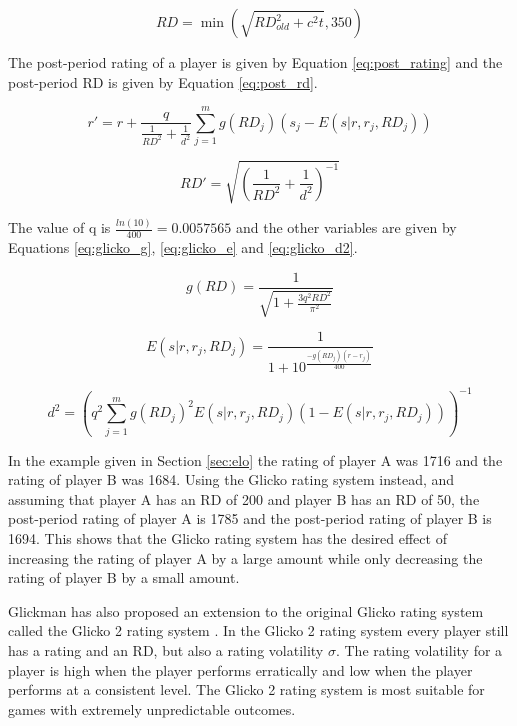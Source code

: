 \begin{equation} \label{eq:pre_rd}
RD = \min \left( \sqrt{RD_{old}^2 + c^2t}, 350 \right)
\end{equation}

The post-period rating of a player is given by Equation \ref{eq:post_rating} and the post-period RD is given by Equation \ref{eq:post_rd}.

\begin{equation} \label{eq:post_rating}
r' = r + \frac{q}{\frac{1}{RD^2} + \frac{1}{d^2}} \sum \limits_{j=1}^m g \left( RD_j \right) \left( s_j - E \left( s | r, r_j, RD_j \right) \right)
\end{equation}

\begin{equation} \label{eq:post_rd}
RD' = \sqrt{\left( \frac{1}{RD^2} + \frac{1}{d^2} \right)^{-1}}
\end{equation}

The value of q is $\frac{ln \left( 10 \right)}{400} = 0.0057565$ and the other variables are given by Equations \ref{eq:glicko_g}, \ref{eq:glicko_e} and \ref{eq:glicko_d2}.

\begin{equation} \label{eq:glicko_g}
g \left( RD \right) = \frac{1}{\sqrt{1 + \frac{3 q^2 RD^2}{\pi^2}}}
\end{equation}

\begin{equation} \label{eq:glicko_e}
E \left( s | r, r_j, RD_j \right) = \frac{1}{1 + 10^{\frac{-g \left( RD_j \right) \left( r - r_j \right)}{400}}}
\end{equation}

\begin{equation} \label{eq:glicko_d2}
d^2 = \left( q^2 \sum \limits_{j=1}^m g \left( RD_j \right)^2 E \left( s | r, r_j, RD_j \right) \left( 1 - E \left( s | r, r_j, RD_j \right) \right) \right)^{-1}
\end{equation}

In the example given in Section \ref{sec:elo} the rating of player A was 1716 and the rating of player B was 1684.
Using the Glicko rating system instead, and assuming that player A has an RD of 200 and player B has an RD of 50, the post-period rating of player A is 1785 and the post-period rating of player B is 1694.
This shows that the Glicko rating system has the desired effect of increasing the rating of player A by a large amount while only decreasing the rating of player B by a small amount.

Glickman has also proposed an extension to the original Glicko rating system called the Glicko 2 rating system \cite{glicko2}.
In the Glicko 2 rating system every player still has a rating and an RD, but also a rating volatility $\sigma$.
The rating volatility for a player is high when the player performs erratically and low when the player performs at a consistent level.
The Glicko 2 rating system is most suitable for games with extremely unpredictable outcomes.

